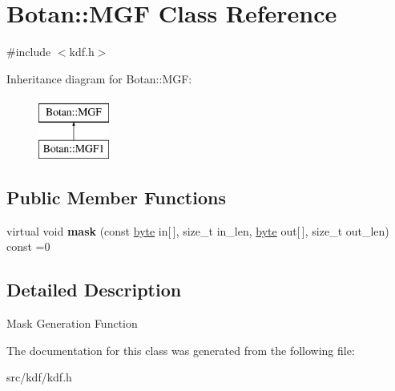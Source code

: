 \hypertarget{classBotan_1_1MGF}{\section{Botan\-:\-:M\-G\-F Class Reference}
\label{classBotan_1_1MGF}
}


{\ttfamily \#include $<$kdf.\-h$>$}

Inheritance diagram for Botan\-:\-:M\-G\-F\-:\begin{figure}[H]
\begin{center}
\leavevmode
\includegraphics[height=2.000000cm]{classBotan_1_1MGF}
\end{center}
\end{figure}
\subsection*{Public Member Functions}
\begin{DoxyCompactItemize}
\item 
\hypertarget{classBotan_1_1MGF_a727e97eb841513eef2b7b7a77b5fb723}{virtual void {\bfseries mask} (const \hyperlink{namespaceBotan_a7d793989d801281df48c6b19616b8b84}{byte} in\mbox{[}$\,$\mbox{]}, size\-\_\-t in\-\_\-len, \hyperlink{namespaceBotan_a7d793989d801281df48c6b19616b8b84}{byte} out\mbox{[}$\,$\mbox{]}, size\-\_\-t out\-\_\-len) const =0}\label{classBotan_1_1MGF_a727e97eb841513eef2b7b7a77b5fb723}

\end{DoxyCompactItemize}


\subsection{Detailed Description}
Mask Generation Function 

The documentation for this class was generated from the following file\-:\begin{DoxyCompactItemize}
\item 
src/kdf/kdf.\-h\end{DoxyCompactItemize}
